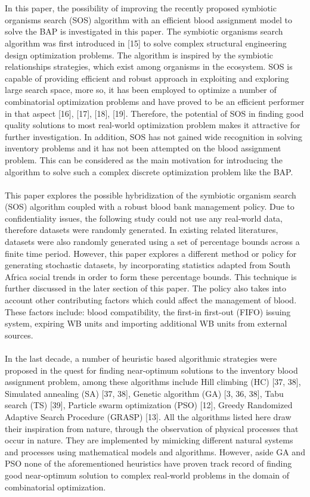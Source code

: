 \documentclass{article}
\begin{document}
\\
\\
In this paper, the possibility of improving the recently proposed symbiotic organisms search (SOS) algorithm with an efficient blood assignment model to solve the BAP is investigated in this paper. The symbiotic organisms search algorithm was first introduced in [15] to solve complex structural engineering design optimization problems. The algorithm is inspired by the symbiotic relationships strategies, which exist among organisms in the ecosystem. SOS is capable of providing efficient and robust approach in exploiting and exploring large search space, more so, it has been employed to optimize a number of combinatorial optimization problems and have proved to be an efficient performer in that aspect [16], [17], [18], [19]. Therefore, the potential of SOS in finding good quality solutions to most real-world optimization problem makes it attractive for further investigation. In addition, SOS has not gained wide recognition in solving inventory problems and it has not been attempted on the blood assignment problem. This can be considered as the main motivation for introducing the algorithm to solve such a complex discrete optimization problem like the BAP.
\\
\\
This paper explores the possible hybridization of the symbiotic organism search (SOS) algorithm coupled with a robust blood bank management policy. Due to confidentiality issues, the following study could not use any real-world data, therefore datasets were randomly generated. In existing related literatures, datasets were also randomly generated using a set of percentage bounds across a finite time period. However, this paper explores a different method or policy for generating stochastic datasets, by incorporating statistics adapted from South Africa social trends in order to form these percentage bounds. This technique is further discussed in the later section of this paper.  The policy also takes into account other contributing factors which could affect the management of blood. These factors include: blood compatibility, the first-in first-out (FIFO) issuing system, expiring WB units and importing additional WB units from external sources.
\\
\\
In the last decade, a number of heuristic based algorithmic strategies were proposed in the quest for finding near-optimum solutions to the inventory blood assignment problem, among these algorithms include Hill climbing (HC) [37, 38], Simulated annealing (SA) [37, 38], Genetic algorithm (GA) [3, 36, 38], Tabu search (TS) [39], Particle swarm optimization (PSO) [12], Greedy Randomized Adaptive Search Procedure (GRASP) [13]. All the algorithms listed here draw their inspiration from nature, through the observation of physical processes that occur in nature. They are implemented by mimicking different natural systems and processes using mathematical models and algorithms. However, aside GA and PSO none of the aforementioned heuristics have proven track record of finding good near-optimum solution to complex real-world problems in the domain of combinatorial optimization.
\end{document}
